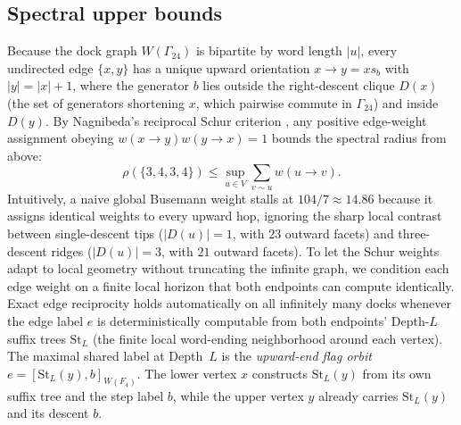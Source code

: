 \subsection{Spectral upper bounds}

Because the dock graph $W(\Gamma_{24})$ is bipartite by word length $|u|$, every undirected edge $\{x, y\}$ has a unique
upward orientation $x \to y = x s_b$ with $|y| = |x| + 1$, where the generator $b$ lies outside the right-descent clique
$D(x)$ (the set of generators shortening $x$, which pairwise commute in $\Gamma_{24}$) and inside $D(y)$. By Nagnibeda's
reciprocal Schur criterion \cite{nagnibeda1997}, any positive edge-weight assignment obeying $w(x \to y) w(y \to x) = 1$
bounds the spectral radius from above:
\begin{equation}
\rho(\{3,4,3,4\}) \le \sup_{u \in V} \sum_{v \sim u} w(u \to v).
\label{eq:schur-criterion}
\end{equation}
Intuitively, a naive global Busemann weight stalls at $104/7 \approx 14.86$ because it assigns identical weights to every
upward hop, ignoring the sharp local contrast between single-descent tips ($|D(u)| = 1$, with $23$ outward facets) and
three-descent ridges ($|D(u)| = 3$, with $21$ outward facets). To let the Schur weights adapt to local geometry without
truncating the infinite graph, we condition each edge weight on a finite local horizon that both endpoints can compute
identically. Exact edge reciprocity holds automatically on all infinitely many docks whenever the edge label $e$ is
deterministically computable from both endpoints' Depth-$L$ suffix trees $\mathrm{St}_L$ (the finite local word-ending
neighborhood around each vertex). The maximal shared label at Depth~$L$ is the \emph{upward-end flag orbit}
$e = [\mathrm{St}_L(y), b]_{W(F_4)}$. The lower vertex $x$ constructs $\mathrm{St}_L(y)$ from its own suffix tree and
the step label $b$, while the upper vertex $y$ already carries $\mathrm{St}_L(y)$ and its descent $b$.


